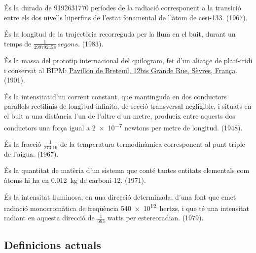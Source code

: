 \begin{list}{}
   {\setlength{\labelwidth}{22mm} \setlength{\leftmargin}{22mm} \setlength{\labelsep}{2mm}}
   \item[\textbf{segon}] És la durada de \num{9192631770} períodes de la
   radiació corresponent a la transició entre els dos nivells
  hiperfins de l'estat fonamental de l'àtom de cesi-133. (1967).
   \item[\textbf{metre}] És la longitud de la trajectòria recorreguda per la llum
   en el buit, durant un temps de $\frac{1}{\num{299792458}}\unit{\,segons}$. (1983).
   \item[\textbf{quilogram}] És la massa del prototip internacional del quilogram, fet d'un aliatge de platí-iridi i
    conservat al BIPM: \href{https://goo.gl/maps/f3XvdjZDTVRgQfsYA}{Pavillon de Breteuil,  12bis Grande Rue, Sèvres, França}. (1901).   
   \item[\textbf{ampere}] És la intensitat d'un corrent constant,
   que mantinguda en dos conductors paraŀlels rectilinis de longitud
   infinita, de secció transversal negligible, i situats en el buit a una
   distància l'un de l'altre d'un metre, produeix entre
   aquests dos conductors  una força igual a \num{2e-7} newtons per metre de longitud. (1948).
   \item[\textbf{kelvin}] És la fracció $\frac{1}{\num{273,16}}$ de la temperatura
   termodinàmica corresponent al punt triple de l'aigua. (1967).
   \item[\textbf{mol}] És la quantitat de matèria d'un sistema que conté tantes
   entitats elementals com àtoms hi ha en \qty{0,012}{kg} de carboni-12. (1971).
   \item[\textbf{candela}] És la intensitat lluminosa, en una direcció determinada,
   d'una font que emet radiació monocromàtica de freqüència \qty{540e12}{hertzs}, i
   que té una intensitat radiant en aquesta direcció de $\frac{1}{683}$ watts per estereoradian. (1979).
\end{list}

\subsection{Definicions actuals}


